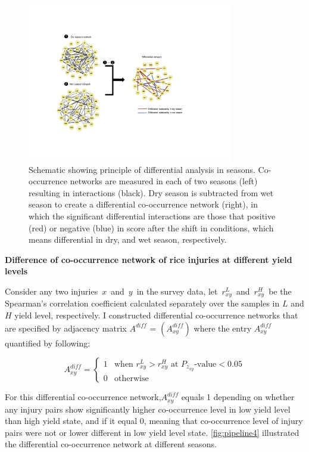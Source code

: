 \begin{figure}
\centering
\includegraphics[width = 0.8\textwidth]{figures/pipeline3.pdf}
\caption{Schematic showing principle of differential analysis in seasons. Co-occurrence networks are measured in each of two seasons (left) resulting in interactions (black). Dry season is subtracted from wet season to create a differential co-occurrence network (right), in which the significant differential interactions are those that positive (red) or negative (blue) in score after the shift in conditions, which means differential in dry, and wet season, respectively.}
\label{fig:pipeline3}
\end{figure} 

\textbf{Difference of co-occurrence network of rice injuries at different yield levels}

Consider any two injuries $x$ and $y$ in the survey data, let $r_{xy}^L$ and $r_{xy}^H$ be the Spearman’s correlation coefficient calculated separately over the samples in $L$ and $H$ yield level, respectively. I constructed differential co-occurrence networks that are specified by adjacency matrix $A^{diff}$ = $(A_{xy}^{diff})$ where the entry $A_{xy}^{diff}$ quantified by following:   

\begin{equation}
A_{xy}^{diff} = \left\{\begin{matrix} 1 & \text{when } r_{xy}^L > r_{xy}^H \text{ at } P_{z_{xy}} \text{-value} < 0.05  \\  0 & \text{otherwise}                             
\end{matrix}\right.
\end{equation}

For  this differential co-occurrence network,$A_{xy}^{diff}$ equals 1 depending on whether any injury pairs show significantly higher co-occurrence level in low yield level than high yield state, and if it equal 0, meaning that co-occurrence level of injury pairs were not or lower different in low yield level state. \ref{fig:pipeline4} illustrated the differential co-occurrence network at different seasons.

